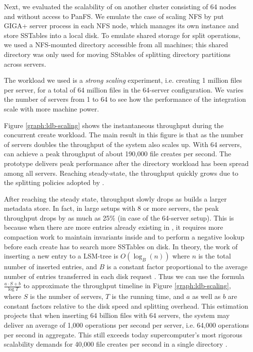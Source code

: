 Next, we evaluated the scalability of \sys on another cluster
consisting of 64 nodes and without access to PanFS.
We emulate the case of scaling NFS by put GIGA+ server process in each NFS node,
which manages its own \tfs instance and store SSTables into a local disk.
To emulate shared storage for split operations,
we used a NFS-mounted directory accessible from all machines;
this shared directory was only used for moving SStables of
splitting directory partitions across servers.

The workload we used is a \textit{strong scaling} experiment, i.e.
creating 1 million files per server, for a total of 64 million files in the
64-server configuration. We varies the number of servers from 1 to 64
to see how the performance of the integration scale with more machine power.

Figure \ref{graph:ldb-scaling} shows the instantaneous throughput
during the concurrent create workload.
The main result in this figure is that as the number of servers doubles the
throughput of the system also scales up. With 64 servers, \giga can achieve a
peak throughput of about 190,000 file creates per second.
The prototype delivers peak performance after the directory workload
has been spread among all servers.
Reaching steady-state, the throughput quickly grows
due to the splitting policies adopted by \giga.



After reaching the steady state, throughput slowly drops
as \tfs builds a larger metadata store.
In fact, in large setups with 8 or more servers,
the peak throughput drops by as much as 25\% (in case of the 64-server setup).
This is because when there are more entries already existing in \tfs,
it requires more compaction work to maintain invariants inside \ldb
and to perform a negative lookup before each create
has to search more SSTables on disk.
In theory, the work of inserting a new entry to a LSM-tree is $O(\log_{B}(n))$
where $n$ is the total number of inserted entries, and $B$ is a constant factor
proportional to the average number of entries transferred in each disk request
\cite{Bender2007}.
Thus we can use the formula $\frac{a\cdot S+b}{\log{T}}$ to
approximate the throughput timeline in Figure \ref{graph:ldb-scaling},
where $S$ is the number of servers, $T$ is the running time,
and $a$ as well as $b$ are constant factors
relative to the disk speed and splitting overhead.
This estimation projects that when inserting 64 billion files with 64 servers,
the system may deliver an average of 1,000 operations per second per server,
i.e. 64,000 operations per second in aggregate.
This still exceeds today supercomputer's most rigorous scalability demands for
40,000 file creates per second in a single directory \cite{hpcs-io:2008}.

